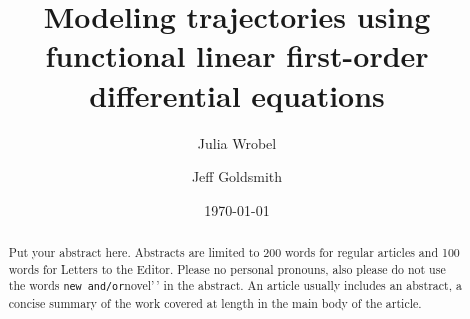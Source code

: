 \documentclass[preprint]{JASA}
\begin{document}

\title[A subtitle goes on another line]{Modeling trajectories using
functional linear first-order differential equations}



\author{Julia Wrobel}

\author{Jeff Goldsmith}






\date{\today}

\begin{abstract}
Put your abstract here. Abstracts are limited to 200 words for regular
articles and 100 words for Letters to the Editor. Please no personal
pronouns, also please do not use the words
\texttt{new\textquotesingle{}\textquotesingle{}\ and/or}novel'\,' in the
abstract. An article usually includes an abstract, a concise summary of
the work covered at length in the main body of the article.
\end{abstract}


\maketitle
\end{document}

